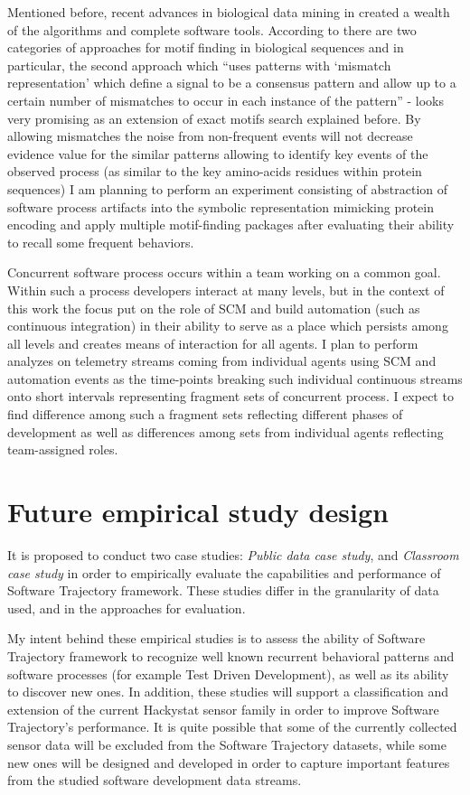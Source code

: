 \documentclass{sig-alternate}
\begin{document}
Mentioned before, recent advances in biological data mining in created a wealth of the algorithms and complete software tools. According to \cite{citeulike:964046} there are two categories of approaches for motif finding in biological sequences and in particular, the second approach which ``uses patterns with `mismatch representation' which define a signal to be a consensus pattern and allow up to a certain number of mismatches to occur in each instance of the pattern'' - looks very promising as an extension of exact motifs search explained before. By allowing mismatches the noise from non-frequent events will not decrease evidence value for the similar patterns allowing to identify key events of the observed process (as similar to the key amino-acids residues within protein sequences) I am planning to perform an experiment consisting of abstraction of software process artifacts into the symbolic representation mimicking protein encoding and apply multiple motif-finding packages after evaluating their ability to recall some frequent behaviors.

Concurrent software process occurs within a team working on a common goal. Within such a process developers interact at many levels, but in the context of this work the focus put on the role of SCM and build automation (such as continuous integration) in their ability to serve as a place which persists among all levels and creates means of interaction for all agents. I plan to perform analyzes on telemetry streams coming from individual agents using SCM and automation events as the time-points breaking such individual continuous streams onto short intervals representing fragment sets of concurrent process. I expect to find difference among such a fragment sets reflecting different phases of development as well as differences among sets from individual agents reflecting team-assigned roles.

\section{Future empirical study design}
It is proposed to conduct two case studies: \textit{Public data case study}, and \textit{Classroom case study} in order to empirically evaluate the capabilities and performance of Software Trajectory framework. These studies differ in the granularity of data used, and in the approaches for evaluation. 

My intent behind these empirical studies is to assess the ability of Software Trajectory framework to recognize well known recurrent behavioral patterns and software processes (for example Test Driven Development), as well as its ability to discover new ones. In addition, these studies will support a classification and extension of the current Hackystat sensor family in order to improve Software Trajectory's performance. It is quite possible that some of the currently collected sensor data will be excluded from the Software Trajectory datasets, while some new ones will be designed and developed in order to capture important features from the studied software development data streams. 
\end{document}
